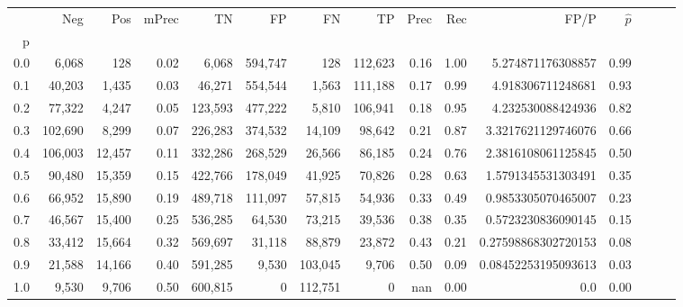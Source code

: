 \begin{tabular}{rrrrrrrrrrrrrrr}
\toprule
{} &      Neg &     Pos & mPrec &       TN &       FP &       FN &       TP &  Prec &   Rec &                 FP/P & $\hat{p}$ \\
p   &          &         &       &          &          &          &          &       &       &                      &           \\
\midrule
0.0 &    6,068 &     128 &  0.02 &    6,068 &  594,747 &      128 &  112,623 &  0.16 &  1.00 &    5.274871176308857 &      0.99 \\
0.1 &   40,203 &   1,435 &  0.03 &   46,271 &  554,544 &    1,563 &  111,188 &  0.17 &  0.99 &    4.918306711248681 &      0.93 \\
0.2 &   77,322 &   4,247 &  0.05 &  123,593 &  477,222 &    5,810 &  106,941 &  0.18 &  0.95 &    4.232530088424936 &      0.82 \\
0.3 &  102,690 &   8,299 &  0.07 &  226,283 &  374,532 &   14,109 &   98,642 &  0.21 &  0.87 &   3.3217621129746076 &      0.66 \\
0.4 &  106,003 &  12,457 &  0.11 &  332,286 &  268,529 &   26,566 &   86,185 &  0.24 &  0.76 &   2.3816108061125845 &      0.50 \\
0.5 &   90,480 &  15,359 &  0.15 &  422,766 &  178,049 &   41,925 &   70,826 &  0.28 &  0.63 &   1.5791345531303491 &      0.35 \\
0.6 &   66,952 &  15,890 &  0.19 &  489,718 &  111,097 &   57,815 &   54,936 &  0.33 &  0.49 &   0.9853305070465007 &      0.23 \\
0.7 &   46,567 &  15,400 &  0.25 &  536,285 &   64,530 &   73,215 &   39,536 &  0.38 &  0.35 &   0.5723230836090145 &      0.15 \\
0.8 &   33,412 &  15,664 &  0.32 &  569,697 &   31,118 &   88,879 &   23,872 &  0.43 &  0.21 &  0.27598868302720153 &      0.08 \\
0.9 &   21,588 &  14,166 &  0.40 &  591,285 &    9,530 &  103,045 &    9,706 &  0.50 &  0.09 &  0.08452253195093613 &      0.03 \\
1.0 &    9,530 &   9,706 &  0.50 &  600,815 &        0 &  112,751 &        0 &   nan &  0.00 &                  0.0 &      0.00 \\
\bottomrule
\end{tabular}
